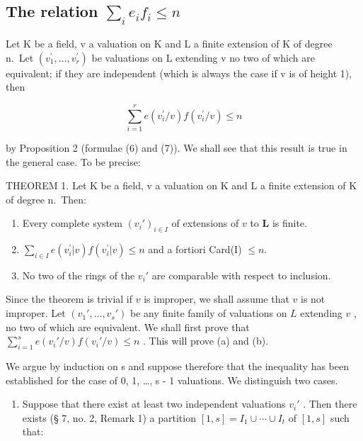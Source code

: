 \subsection{\texorpdfstring{The relation \(\sum_{i} e_i f_i \leqslant n\)}{The relation Σ ei fi ≤ n}}

Let K be a field, v a valuation on K and L a finite extension of K of degree n.~Let \((v_{1}^{\prime}, \ldots, v_{r}^{\prime})\) be valuations on L extending v no two of which are equivalent; if they are independent (which is always the case if v is of height 1), then

\[
\sum_ {i = 1} ^ {r} e (v _ {i} ^ {\prime} / v) f (v _ {i} ^ {\prime} / v) \leqslant n
\]

by Proposition 2 (formulae (6) and (7)). We shall see that this result is true in the general case. To be precise:

THEOREM 1. Let K be a field, v a valuation on K and L a finite extension of K of degree n.~Then:

\begin{enumerate}
\def\labelenumi{(\alph{enumi})}
\item
  Every complete system \((v_i')_{i\in I}\) of extensions of \(v\) to \(\mathbf{L}\) is finite.
\item
  \(\sum_{i\in I}e(v_i^{\prime}|v)f(v_i^{\prime}|v)\leqslant n\) and a fortiori Card(I) \(\leqslant n.\)
\item
  No two of the rings of the \(v_{i}'\) are comparable with respect to inclusion.
\end{enumerate}

Since the theorem is trivial if \(v\) is improper, we shall assume that \(v\) is not improper. Let \((v_1', \ldots, v_s')\) be any finite family of valuations on \(L\) extending \(v\) , no two of which are equivalent. We shall first prove that \(\sum_{i=1}^{s} e(v_i'/v)f(v_i'/v) \leqslant n\) . This will prove (a) and (b).

We argue by induction on s and suppose therefore that the inequality has been established for the case of 0, 1, \ldots, s - 1 valuations. We distinguish two cases.

\begin{enumerate}
\def\labelenumi{(\arabic{enumi})}
\tightlist
\item
  Suppose that there exist at least two independent valuations \(v_i'\) . Then there exists (§ 7, no. 2, Remark 1) a partition \([1, s] = I_1 \cup \cdots \cup I_t\) of \([1, s]\) such that:
\end{enumerate}

